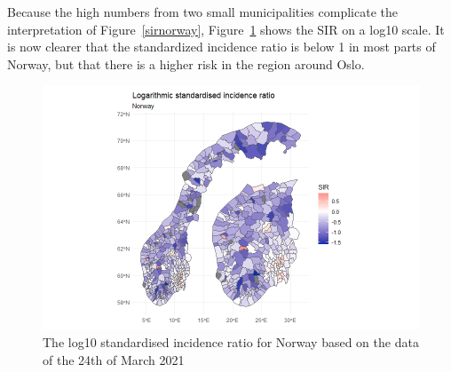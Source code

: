 Because the high numbers from two small municipalities complicate the interpretation of Figure~\ref{sirnorway}, Figure~\ref{sirnorwaylog} shows the SIR on a log10 scale. It is now clearer that the standardized incidence ratio is below 1 in most parts of Norway, but that there is a higher risk in the region around Oslo.
%   
\begin{figure}[H]
  \centering
  \includegraphics[width = 1.2\textwidth]{sir_norway_log.png}
  \caption{The log10 standardised incidence ratio for Norway based on the data of the 24th of March 2021}
  \label{sirnorwaylog}
\end{figure}
\clearpage
